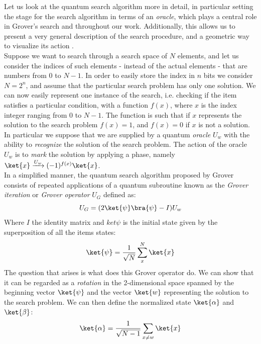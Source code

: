 \noindent
Let us look at the quantum search algorithm more in detail, in particular setting the stage for the search algorithm in terms of an \textit{oracle}, which plays a central role in Grover's search and throughout our work. Additionally, this allows us to present a very general description of the search procedure, and a geometric way to visualize its action \cite{Nielsen2000}. \\

\noindent
Suppose we want to search through a search space of $N$ elements, and let us consider the indices of such elements - instead of the actual elements - that are numbers from 0 to $N-1$. In order to easily store the index in $n$ bits we consider $N=2^n$, and assume that the particular search problem has only one solution. We can now easily represent one instance of the search, i.e. checking if the item satisfies a particular condition, with a function $f(x)$, where $x$ is the index integer ranging from 0 to $N-1$. The function is such that if $x$ represents the solution to the search problem $f(x)=1$, and $f(x)=0$ if $x$ is not a solution. In particular we suppose that we are supplied by a quantum \textit{oracle} $U_w$ with the ability to \textit{recognize} the solution of the search problem. The action of the oracle $U_w$ is to \textit{mark} the solution by applying a phase, namely $\ket{x}\xrightarrow{U_w}(-1)^{f(x)}\ket{x}$. \\ In a simplified manner, the quantum search algorithm proposed by Grover consists of repeated applications of a quantum subroutine known as the \textit{Grover iteration} or \textit{Grover operator} $U_G$ defined as:
\begin{equation}
  U_G = (2\ket{\psi}\bra{\psi}-I)U_w
\end{equation}
Where $I$ the identity matrix and $ket{\psi}$ is the initial state given by the superposition of all the items states:
\begin{equation}
  \ket{\psi} = \frac{1}{\sqrt{N}}\sum_x^N\ket{x}
\end{equation}
The question that arises is what does this Grover operator do. We can show that it can be regarded as a \textit{rotation} in the 2-dimensional space spanned by the beginning vector $\ket{\psi}$ and the vector $\ket{w}$ representing the solution to the search problem. We can then define the normalized state $\ket{\alpha}$ and $\ket{\beta}$:
\begin{equation}
    \ket{\alpha} = \frac{1}{\sqrt{N-1}}\sum_{x\neq w}\ket{x}
\end{equation}
